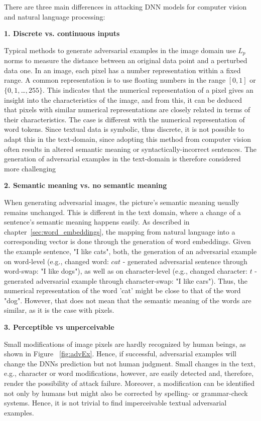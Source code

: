 There are three main differences in attacking DNN models for computer vision and natural language processing:

\textbf{1. Discrete vs. continuous inputs}

Typical methods to generate adversarial examples in the image domain use $L_p$ norms to measure the distance between an original data point and a perturbed data one. 
In an image, each pixel has a number representation within a fixed range. A common representation is to use floating numbers in the range ${[0,1]}$ or ${\{0,1,}$\dots${,255\}}$. This indicates that the numerical representation of a pixel gives an insight into the characteristics of the image, and from this, it can be deduced that pixels with similar numerical representations are closely related in terms of their characteristics. The case is different with the numerical representation of word tokens.
Since textual data is symbolic, thus discrete, it is not possible to adapt this in the text-domain, since adopting this method from computer vision often results in altered semantic meaning or syntactically-incorrect sentences. The generation of adversarial examples in the text-domain is therefore considered more challenging\cite{carlini2018audio} 

\textbf{2. Semantic meaning vs. no semantic meaning}

When generating adversarial images, the picture's semantic meaning usually remains unchanged. This is different in the text domain, where a change of a sentence's semantic meaning happens easily. As described in chapter~\ref{sec:word_embeddings}, the mapping from natural language into a corresponding vector is done through the generation of word embeddings.
Given the example sentence, "I like cats", both, the generation of an adversarial example on word-level (e.g., changed word: $cat$ - generated adversarial sentence through word-swap: "I like dogs"), as well as on character-level (e.g., changed character: $t$ - generated adversarial example through character-swap: "I like cars"). Thus, the numerical representation of the word 'cat' might be close to that of the word "dog".
However, that does not mean that the semantic meaning of the words are similar, as it is the case with pixels.


\textbf{3. Perceptible vs unperceivable}

Small modifications of image pixels are hardly recognized by human beings, as shown in Figure ~\ref{fig:advEx}. Hence, if successful, adversarial examples will change the DNNs prediction but not human judgment. Small changes in the text, e.g., character or word modifications, however, are easily detected and, therefore, render the possibility of attack failure. Moreover, a modification can be identified not only by humans but might also be corrected by spelling- or grammar-check systems. Hence, it is not trivial to find imperceivable textual adversarial examples.



